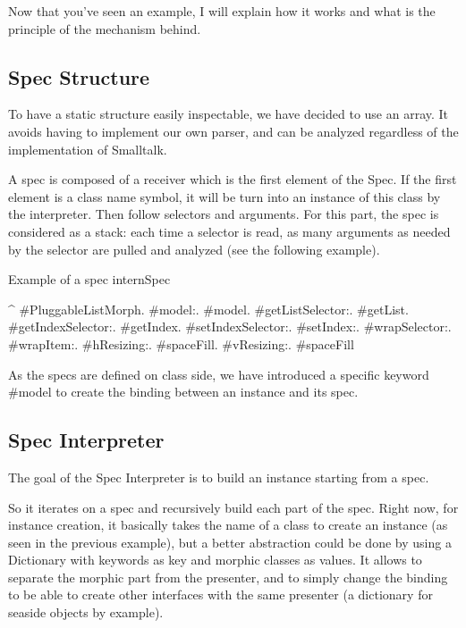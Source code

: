 \documentclass[a4paper,10pt,twoside]{book}
\begin{document}
Now that you've seen an example, I will explain how it works and what is the principle of the mechanism behind.

\subsection{Spec Structure}

To have a static structure easily inspectable, we have decided to use an array. It avoids having to implement our own parser, and can be analyzed regardless of the implementation of Smalltalk.

A spec is composed of a receiver which is the first element of the Spec. If the first element is a class name symbol, it will be turn into an instance of this class by the interpreter. Then follow selectors and arguments. For this part, the spec is considered as a stack: each time a selector is read, as many arguments as needed by the selector are pulled and analyzed (see the following example).

\begin{method}{Example of a spec}
internSpec

	^ {#PluggableListMorph.
	    	#model:.			  	  #model.
			#getListSelector:.	  #getList.
			#getIndexSelector:.	#getIndex.
			#setIndexSelector:.	#setIndex:.
			#wrapSelector:.	  	 #wrapItem:.
			#hResizing:.			#spaceFill.
			#vResizing:.			#spaceFill		}
\end{method} 

As the specs are defined on class side, we have introduced a specific keyword \#model to create the binding between an instance and its spec.

\subsection{Spec Interpreter}

The goal of the Spec Interpreter is to build an instance starting from a spec.

So it iterates on a spec and recursively build each part of the spec.
Right now, for instance creation, it basically takes the name of a class to create an instance (as seen in the previous example), but a better abstraction could be done by using a Dictionary with keywords as key and morphic classes as values. It allows to separate the morphic part from the presenter, and to simply change the binding to be able to create other interfaces with the same presenter (a dictionary for seaside objects by example).
\end{document}
